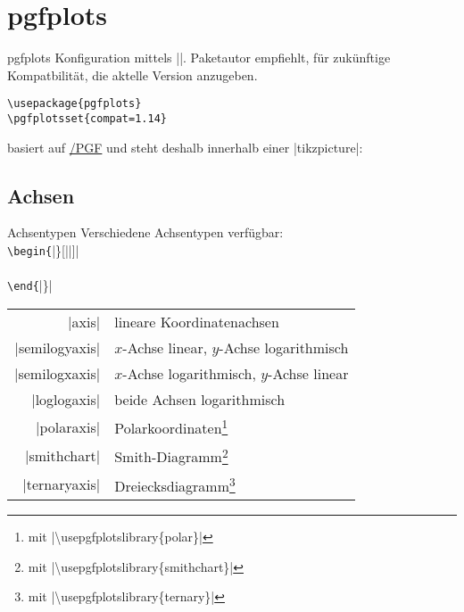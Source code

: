 \documentclass[
	vorläufig=false,
	datum=2017-12-01,
	titel={Diagramme},
	web=false,
	mo,
	aspectratio=1610,
]{../tex/latexkurs-slides}
\begin{document}
\section{pgfplots}
\begin{frame}[fragile]{pgfplots}
Konfiguration mittels ||. Paketautor empfiehlt, für zukünftige Kompatbilität, die aktelle Version anzugeben.
\begin{lstlisting}
\usepackage{pgfplots}
\pgfplotsset{compat=1.14}
\end{lstlisting}
\pause
{} basiert auf \href{http://ctan.org/pkg/pgf}{\TikZ/PGF} und steht deshalb innerhalb einer |tikzpicture|:
\begingroup
\pgfplotsset{scale=0.5}
\begin{LTXexample}[pos=r, explpreset={}, preset=, rframe={}]
\end{LTXexample}
\endgroup
\end{frame}


\subsection{Achsen}
\begin{frame}{Achsentypen}
Verschiedene Achsentypen verfügbar: \\[1em]
\texttt{\textbackslash begin\{}|\}[||]|\\
\quad{}\\
\texttt{\textbackslash end\{}|\}|

\vfill

\begin{tabular}{rl}
|axis| & lineare Koordinatenachsen\\
|semilogyaxis| & $x$-Achse linear, $y$-Achse logarithmisch\\
|semilogxaxis| & $x$-Achse logarithmisch, $y$-Achse linear\\
|loglogaxis| & beide Achsen logarithmisch\\
|polaraxis| & Polarkoordinaten\footnote{mit |\textbackslash usepgfplotslibrary\{polar\}|}\\
|smithchart| & Smith-Diagramm\footnote{mit |\textbackslash usepgfplotslibrary\{smithchart\}|}\\
|ternaryaxis| & Dreiecksdiagramm\footnote{mit |\textbackslash usepgfplotslibrary\{ternary\}|}
\end{tabular}
\end{frame}
\end{document}
